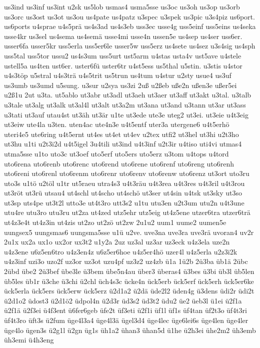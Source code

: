{us3ind
us3inf
us3int
u2sk
us5lob
usmas4
usma5sse
us3oc
us3oh
us3op
us3orb
us3orc
us3ost
us3ot
us3ou
us4pate
us4patz
u3spec
u3spek
us3pic
u3s4piz
us6port.
us6ports
u4sprae
u4s5prä
us4s3ad
us4s3eb
uss3ec
usse4g
uss5einf
uss5eins
us4seka
usse4kr
us3sel
us4sema
us4semä
usse4mi
usse4n
ussen5e
us4sep
us4ser
uss6er.
usser6fa
usser5kr
uss5erla
uss5er6le
usser5w
uss5erz
us4sete
us4sez
u3s4sig
us4sph
uss5tal
uss5tor
ussu2
us4s3um
uss5urt
ust5arm
u4stas
usta4v
ust5ave
u4stele
ustell5a
us4ten
ust6er.
uster6fü
uster6tr
u4st5ess
us5thal
u5stin.
u3stis
u4stor
u4s3töp
u5stral
u4s3trä
u4s5trit
us5trun
us4tum
u4stur
u2sty
usue4
us3uf
us3umb
us3umd
u5sung.
u3sur
u2sya
us3zi
2uß
u2ßeb
uße2n
ußen3e
ußer5ei
u2ß1u
2ut
u3ta.
ut5ablo
ut3abr
ut3adl
ut3aeh
ut3aer
ut3aff
ut3akt
u3tal.
u3talb
u3tale
ut3alg
ut3alk
ut3al4l
ut3alt
ut3a2m
ut3ana
ut3and
u3tann
ut3ar
ut3ass
u3tati
ut3auf
utau4st
ut3äh
ut3är
u1te
ut3ede
ute3e
uteg2
ut3ei.
ut3eie
u4t3eig
ut3eiw
ute4la
u3ten.
uten4ac
ute4n3e
u4t5entf
uter3a
utergene6
u4t5erhö
uteri4e5
ute6ring
u4t5ernt
ut4es
ut4et
ut4ev
u2tex
utfi2
ut3hel
ut3hi
u2t3ho
ut3hu
u1ti
u2t3i2d
u4t5igel
3u4tili
ut3ind
u4t3inf
u2t3ir
u4tiso
uti4vi
utmas4
utma5sse
u1to
uto3c
ut3oef
uto5erf
uto5ers
uto5erz
u3tom
u4tops
u4tord
uto6rena
uto6renb
uto6renc
uto6rend
uto6rene
uto6renf
uto6reng
uto6renh
uto6reni
uto6renl
uto6renm
uto6renr
uto6renv
uto6renw
uto6renz
ut3ort
uto3ru
uto3s
u1tö
u2töl
u1tr
ut5raeu
utra4s3
u4t3räu
u4t3rea
u4t3res
u4t3ril
u4t3rou
ut3röt
ut3rü
utsau4
ut4schl
ut4scho
ut4schö
ut3ser
ut4sin
u4tsk
ut3sky
ut3so
ut3sp
uts4pe
ut3t2l
utto3e
ut4t3ro
utt3s2
u1tu
utu3en
u2t3um
utu2n
u4t3une
utu4re
utu3ro
utu3ru
ut2za
ut4zed
utz5ehr
utz5eig
ut4z5ene
utzer6tra
utzer6trä
ut4z3e4t
ut4z3in
ut4zis
ut2zo
ut2zö
ut2zw
2u1u2
uum1
uume2
uumen5e
uungsex5
uungsmas6
uungsma5sse
u1ü
u2ve.
uve3na
uve3ra
uve3rä
uvoran4
uv2r
2u1x
ux2a
ux1o
ux2or
ux3t2
u1y2a
2uz
uz3al
uz3ar
uz3eck
u4z3ela
uze2n
u4z3ene
u6z5en6tro
u4z3en4z
u6z5er6hoe
u4z5er4hö
uzer4l
u4z5erla
u2z3i2k
u4z3inf
uzi3o
uzo2f
uz3or
uz3ot
uzu4pf
uz3z2
uz4zb
ü1a
1ü2b
2ü3ba
üb1ä
2übc
2übd
übe2
2ü3bef
übe3le
ü3bem
übe5n4au
über3
überas4
ü3bes
ü3bi
üb3l
üb5len
üb5les
üb1r
ü3che
ü3chi
ü2chl
üch4s3c
ücke4n
ück5erb
ück5erf
ück5erh
ück5er6ke
ück5erla
ück5ers
ück5erw
ück5erz
ü2d1a2
ü2dä
üde2l2
üden4g
ü3dens
üdi2r
üdi2t
ü2d1o2
üdost3
ü2d1ö2
üdpol4n
ü2d3r
üd3s2
üd3t2
üdu2
üe2
üeb3l
ü1ei
ü2f1a
ü2f1ä
ü2f3ei
ü4f3ent
ü6fer6geb
üfe2t
üf3eti
ü2f1i
üf1l
üf1s
üf4tan
üf2t3o
üf4t3ri
üf4t3ro
üft3s
ü2fum
üge4l3a4
üge4l3ä
ügel3d4
üge4lec
üge6lei6s
üge4len
üge4ler
üge4lo
ügen3s
ü2g1l
ü2gn
üg1s
üh1a2
ühan3
ühan5d
ü1he
ü2h3ei
ühe2m2
üh3emb
üh3emi
ü4h3eng
}
